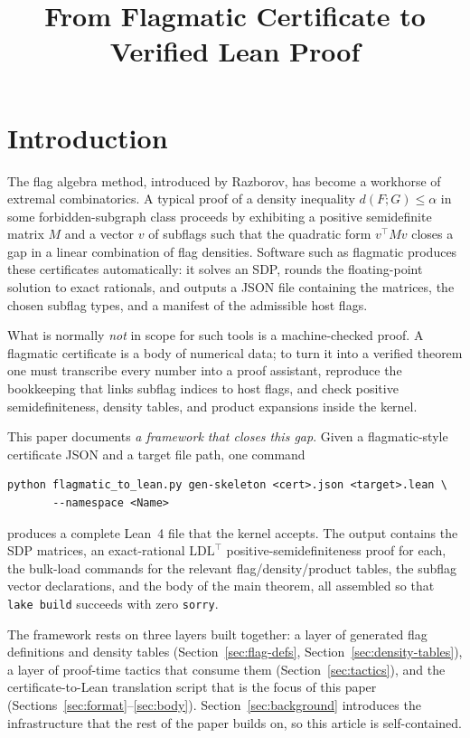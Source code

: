 \documentclass[11pt]{article}
\title{From Flagmatic Certificate to Verified Lean Proof}
\author{}
\date{}
\begin{document}
\maketitle

\section{Introduction}

The flag algebra method, introduced by Razborov, has become a workhorse of
extremal combinatorics. A typical proof of a density inequality
$d(F;G) \le \alpha$ in some forbidden-subgraph class proceeds by exhibiting
a positive semidefinite matrix $M$ and a vector $v$ of subflags such that
the quadratic form $v^\top M v$ closes a gap in a linear combination of
flag densities. Software such as flagmatic produces these certificates
automatically: it solves an SDP, rounds the floating-point solution to
exact rationals, and outputs a JSON file containing the matrices, the
chosen subflag types, and a manifest of the admissible host flags.

What is normally \emph{not} in scope for such tools is a machine-checked
proof. A flagmatic certificate is a body of numerical data; to turn it
into a verified theorem one must transcribe every number into a proof
assistant, reproduce the bookkeeping that links subflag indices to host
flags, and check positive semidefiniteness, density tables, and product
expansions inside the kernel.

This paper documents \emph{a framework that closes this gap}. Given a
flagmatic-style certificate JSON and a target file path, one command
\begin{lstlisting}[language={}]
python flagmatic_to_lean.py gen-skeleton <cert>.json <target>.lean \
       --namespace <Name>
\end{lstlisting}
produces a complete Lean~4 file that the kernel accepts. The output
contains the SDP matrices, an exact-rational $\mathrm{LDL}^\top$
positive-semidefiniteness proof for each, the bulk-load commands for the
relevant flag/density/product tables, the subflag vector declarations,
and the body of the main theorem, all assembled so that
\texttt{lake build} succeeds with zero \texttt{sorry}.

The framework rests on three layers built together: a layer of generated
flag definitions and density tables (Section~\ref{sec:flag-defs},
Section~\ref{sec:density-tables}), a layer of proof-time tactics that
consume them (Section~\ref{sec:tactics}), and the certificate-to-Lean
translation script that is the focus of this paper
(Sections~\ref{sec:format}--\ref{sec:body}). Section~\ref{sec:background}
introduces the infrastructure that the rest of the paper builds on, so
this article is self-contained.
\end{document}
